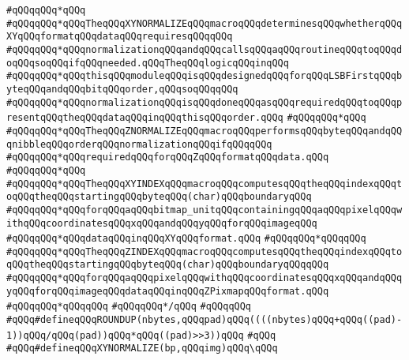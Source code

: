 \verb|#qQQqqQQq*qQQq|\newline
\verb|#qQQqqQQq*qQQqTheqQQqXYNORMALIZEqQQqmacroqQQqdeterminesqQQqwhetherqQQqXYqQQqformatqQQqdataqQQqrequiresqQQqqQQq|\newline
\verb|#qQQqqQQq*qQQqnormalizationqQQqandqQQqcallsqQQqaqQQqroutineqQQqtoqQQqdoqQQqsoqQQqifqQQqneeded.qQQqTheqQQqlogicqQQqinqQQq|\newline
\verb|#qQQqqQQq*qQQqthisqQQqmoduleqQQqisqQQqdesignedqQQqforqQQqLSBFirstqQQqbyteqQQqandqQQqbitqQQqorder,qQQqsoqQQqqQQq|\newline
\verb|#qQQqqQQq*qQQqnormalizationqQQqisqQQqdoneqQQqasqQQqrequiredqQQqtoqQQqpresentqQQqtheqQQqdataqQQqinqQQqthisqQQqorder.qQQq|\newline
\verb|#qQQqqQQq*qQQq|\newline
\verb|#qQQqqQQq*qQQqTheqQQqZNORMALIZEqQQqmacroqQQqperformsqQQqbyteqQQqandqQQqnibbleqQQqorderqQQqnormalizationqQQqifqQQqqQQq|\newline
\verb|#qQQqqQQq*qQQqrequiredqQQqforqQQqZqQQqformatqQQqdata.qQQq|\newline
\verb|#qQQqqQQq*qQQq|\newline
\verb|#qQQqqQQq*qQQqTheqQQqXYINDEXqQQqmacroqQQqcomputesqQQqtheqQQqindexqQQqtoqQQqtheqQQqstartingqQQqbyteqQQq(char)qQQqboundaryqQQq|\newline
\verb|#qQQqqQQq*qQQqforqQQqaqQQqbitmap_unitqQQqcontainingqQQqaqQQqpixelqQQqwithqQQqcoordinatesqQQqxqQQqandqQQqyqQQqforqQQqimageqQQq|\newline
\verb|#qQQqqQQq*qQQqdataqQQqinqQQqXYqQQqformat.qQQq|\newline
\verb|#qQQqqQQq*qQQqqQQq|\newline
\verb|#qQQqqQQq*qQQqTheqQQqZINDEXqQQqmacroqQQqcomputesqQQqtheqQQqindexqQQqtoqQQqtheqQQqstartingqQQqbyteqQQq(char)qQQqboundaryqQQqqQQq|\newline
\verb|#qQQqqQQq*qQQqforqQQqaqQQqpixelqQQqwithqQQqcoordinatesqQQqxqQQqandqQQqyqQQqforqQQqimageqQQqdataqQQqinqQQqZPixmapqQQqformat.qQQq|\newline
\verb|#qQQqqQQq*qQQqqQQq|\newline
\verb|#qQQqqQQq*/qQQq|\newline
\verb|#qQQqqQQq|\newline
\verb|#qQQq#defineqQQqROUNDUP(nbytes,qQQqpad)qQQq((((nbytes)qQQq+qQQq((pad)-1))qQQq/qQQq(pad))qQQq*qQQq((pad)>>3))qQQq|\newline
\verb|#qQQq|\newline
\verb|#qQQq#defineqQQqXYNORMALIZE(bp,qQQqimg)qQQq\qQQq|\newline
